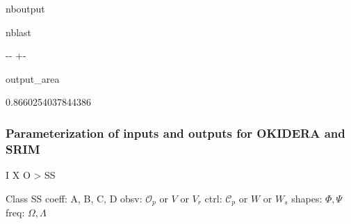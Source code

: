 \documentclass[letterpaper,10pt,english]{sphinxmanual}
\begin{document}
\begin{sphinxuseclass}{nboutput}
\begin{sphinxuseclass}{nblast}
{

\kern-\sphinxverbatimsmallskipamount\kern-\baselineskip
\kern+\FrameHeightAdjust\kern-\fboxrule
\vspace{\nbsphinxcodecellspacing}

\begin{sphinxuseclass}{output_area}
\begin{sphinxuseclass}{}


\begin{sphinxVerbatim}[commandchars=\\\{\}]
\llap{\color{nbsphinxout}[8]:\,\hspace{\fboxrule}\hspace{\fboxsep}}0.8660254037844386
\end{sphinxVerbatim}



\end{sphinxuseclass}
\end{sphinxuseclass}
}

\end{sphinxuseclass}
\end{sphinxuseclass}

\subsubsection{Parameterization of inputs and outputs for OKID\sphinxhyphen{}ERA and SRIM}
\label{\detokenize{examples/05_MIMO_Event:Parameterization-of-inputs-and-outputs-for-OKID-ERA-and-SRIM}}
\sphinxAtStartPar
I X O \sphinxhyphen{}\textgreater{} SS

\sphinxAtStartPar
Class SS \sphinxhyphen{} coeff: A, B, C, D \sphinxhyphen{} obsv: \(\mathcal{O}_{p}\) or \(V\) or \(V_r\) \sphinxhyphen{} ctrl: \(\mathcal{C}_{p}\) or \(W\) or \(W_s\) \sphinxhyphen{} shapes: \(\Phi, \Psi\) \sphinxhyphen{} freq: \(\Omega, \Lambda\)
\end{document}
